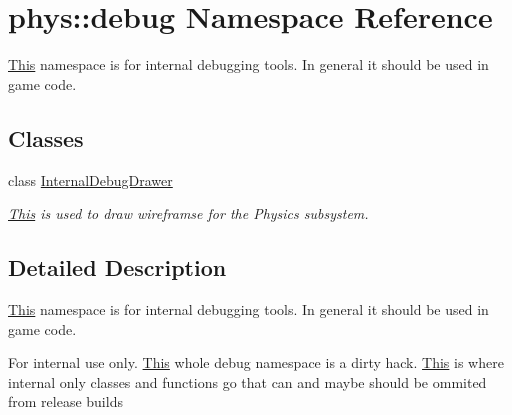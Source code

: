 \hypertarget{namespacephys_1_1debug}{
\section{phys::debug Namespace Reference}
\label{d0/d53/namespacephys_1_1debug}
}


\hyperlink{structThis}{This} namespace is for internal debugging tools. In general it should be used in game code.  


\subsection*{Classes}
\begin{DoxyCompactItemize}
\item 
class \hyperlink{classphys_1_1debug_1_1InternalDebugDrawer}{InternalDebugDrawer}
\begin{DoxyCompactList}\small\item\em \hyperlink{structThis}{This} is used to draw wireframse for the Physics subsystem. \item\end{DoxyCompactList}\end{DoxyCompactItemize}


\subsection{Detailed Description}
\hyperlink{structThis}{This} namespace is for internal debugging tools. In general it should be used in game code. \begin{DoxyInternal}{For internal use only.}
\hyperlink{structThis}{This} whole debug namespace is a dirty hack. \hyperlink{structThis}{This} is where internal only classes and functions go that can and maybe should be ommited from release builds \end{DoxyInternal}
